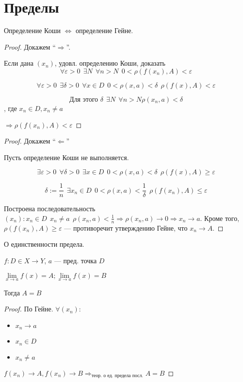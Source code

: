 

\cfoot{}



\section{Пределы}

\begin{theorem}
    Определение Коши $\Leftrightarrow$ определение Гейне.
\end{theorem}
\begin{proof}
    Докажем ``$\Rightarrow$''.

    Если дана $(x_n)$, удовл. определению Коши, доказать $$\forall \varepsilon>0 \ \ \exists N \ \ \forall n > N \ \ 0<\rho(f(x_n), A)<\varepsilon$$

    $$\forall \varepsilon>0 \ \ \exists \delta>0 \ \ \forall x \in D \ \ 0<\rho(x, a)<\delta \ \ \rho(f(x), A)<\varepsilon$$

    $$\text{Для этого } \delta \ \ \exists N \ \ \forall n>N \rho(x_n,a)<\delta$$, где $x_n\in D, x_n\not = a$

    $\Rightarrow \rho(f(x_n), A)<\varepsilon$
\end{proof}
\begin{proof}
    Докажем ``$\Leftarrow$''

    Пусть определение Коши не выполняется.

    $$\exists \varepsilon>0 \ \ \forall \delta>0 \ \ \exists x\in D \ \ 0<\rho(x,a)<\delta \ \ \rho(f(x), A)\geq \varepsilon$$

    $$\delta:=\frac{1}{n} \ \ \exists x_n\in D \ \ 0<\rho(x,a)<\frac{1}{\delta} \ \ \rho(f(x_n), A)\leq\varepsilon$$

    Построена последовательность $(x_n): x_n\in D \ \ x_n\not = a \ \ \rho(x_n, a)<\frac{1}{n} \Rightarrow \rho(x_n, a)\to 0 \Rightarrow x_n\to a$. Кроме того, $\rho(f(x_n), A)\geq \varepsilon$ --- противоречит утверждению Гейне, что $x_n\to A$.
\end{proof}

\begin{theorem}
    О единственности предела.

    $f: D\in X\to Y$, $a$ --- пред. точка $D$

    $\lim\limits_{x\to a} f(x)=A; \lim\limits_{x\to a} f(x)=B$

    Тогда $A=B$
\end{theorem}
\begin{proof}
    По Гейне.
    $\forall (x_n):$
    \begin{itemize}
        \itemsep0em
        \item $x_n\to a$
        \item $x_n\in D$
        \item $x_n\not=a$
    \end{itemize}
    
    $f(x_n)\to A, f(x_n)\to B \Rightarrow_{\text{теор. о ед. предела посл.}} A=B$
\end{proof}

